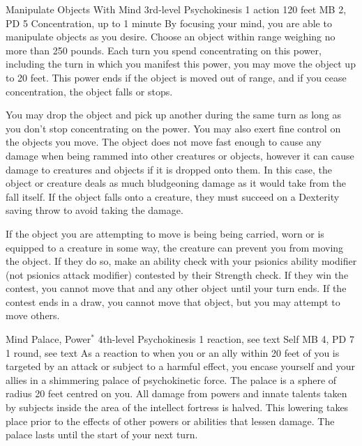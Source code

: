   \DndPowerHeader%
    {Manipulate Objects With Mind}
    {3rd-level Psychokinesis}
    {1 action}
    {120 feet}
    {MB 2, PD 5}
    {Concentration, up to 1 minute}
  By focusing your mind, you are able to manipulate objects as you desire.
  Choose an object within range weighing no more than 250 pounds.
  Each turn you spend concentrating on this power,
  including the turn in which you manifest this power,
  you may move the object up to 20 feet.
  This power ends if the object is moved out of range,
  and if you cease concentration,
  the object falls or stops.

  You may drop the object and pick up another during
  the same turn as long as you don't stop concentrating
  on the power.
  You may also exert fine control on the objects you move.
  The object does not move fast enough to cause any damage
  when being rammed into other creatures or objects,
  however it can cause damage to creatures and objects
  if it is dropped onto them.
  In this case, the object or creature deals as much
  bludgeoning damage as it would take from the fall itself.
  If the object falls onto a creature,
  they must succeed on a Dexterity saving throw
  to avoid taking the damage.

  If the object you are attempting to move is being being carried, worn
  or is equipped to a creature in some way,
  the creature can prevent you from moving the object.
  If they do so, make an ability check with your
  psionics ability modifier (not psionics attack modifier)
  contested by their Strength check.
  If they win the contest, you cannot move that and
  any other object until your turn ends.
  If the contest ends in a draw, you cannot move
  that object, but you may attempt to move others.
  
\DndPowerHeader%
  {Mind Palace, Power$^*$}
  {4th-level Psychokinesis}
  {1 reaction, see text}
  {Self}
  {MB 4, PD 7}
  {1 round, see text}
  As a reaction to when you or an ally within 20 feet of you
  is targeted by an attack or subject to a harmful effect,
  you encase yourself and your allies in a
  shimmering palace of psychokinetic force.
  The palace is a sphere of radius 20 feet centred on you. 
  All damage from powers and innate talents
  taken by subjects inside the area of the intellect fortress
  is halved.
  This lowering takes place prior to the effects
  of other powers or abilities that lessen damage.
  The palace lasts until the start of your next turn.
  

